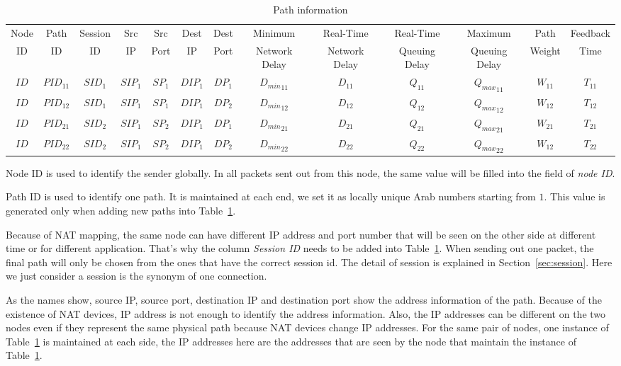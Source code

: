 \begin{table}
\small
\caption{\label{tb.pi}Path information}
\centering
\begin{tabular}{|c|c|c|c|c|c|c|c|c|c|c|c|c|}
\hline
Node &  Path & Session & Src &   Src & Dest & Dest &   Minimum       & Real-Time      & Real-Time      & Maximum       & Path    & Feedback\\
 ID  &   ID  & ID & IP  &  Port &  IP  & Port &  Network Delay  & Network Delay  & Queuing Delay  & Queuing Delay & Weight  & Time\\
\hline
$ID$&${PID}_{11}$&${SID}_{1}$&${SIP}_{1}$&${SP}_{1}$&${DIP}_{1}$&${DP}_{1}$&${D_{min}}_{11}$&$D_{11}$&${Q}_{11}$&${{Q}_{max}}_{11}$&$W_{11}$&$T_{11}$ \\
\hline
$ID$&${PID}_{12}$&${SID}_{1}$&${SIP}_{1}$&${SP}_{1}$&${DIP}_{1}$&${DP}_{2}$&${D_{min}}_{12}$&$D_{12}$&${Q}_{12}$&${{Q}_{max}}_{12}$&$W_{12}$&$T_{12}$ \\
\hline
$ID$&${PID}_{21}$&${SID}_{2}$&${SIP}_{1}$&${SP}_{2}$&${DIP}_{1}$&${DP}_{1}$&${D_{min}}_{21}$&$D_{21}$&${Q}_{21}$&${{Q}_{max}}_{21}$&$W_{21}$&$T_{21}$ \\
\hline
$ID$&${PID}_{22}$&${SID}_{2}$&${SIP}_{1}$&${SP}_{2}$&${DIP}_{1}$&${DP}_{2}$&${D_{min}}_{22}$&$D_{22}$&${Q}_{22}$&${{Q}_{max}}_{22}$&$W_{12}$&$T_{22}$ \\
\hline
\end{tabular}
\end{table}

Node ID is used to identify the sender globally. In all packets sent out from this node, the same value will be filled into the field of \emph{node ID}.

Path ID is used to identify one path. It is maintained at each end, we set it as locally unique Arab numbers starting from $1$. This value is generated only when adding new paths into Table~\ref{tb.pi}. 

Because of NAT mapping, the same node can have different IP address and port number that will be seen on the other side at different time or for different application. That's why the column \emph{Session ID} needs to be added into Table~\ref{tb.pi}. When sending out one packet, the final path will only be chosen from the ones that have the correct session id. The detail of session is explained in Section~\ref{sec:session}. Here we just consider a session is the synonym of one connection.

As the names show, source IP, source port, destination IP and destination port show the address information of the path. Because of the existence of NAT devices, IP address is not enough to identify the address information. Also, the IP addresses can be different on the two nodes even if they represent the same physical path because NAT devices change IP addresses. For the same pair of nodes, one instance of Table~\ref{tb.pi} is maintained at each side, the IP addresses here are the addresses that are seen by the node that maintain the instance of Table~\ref{tb.pi}.

